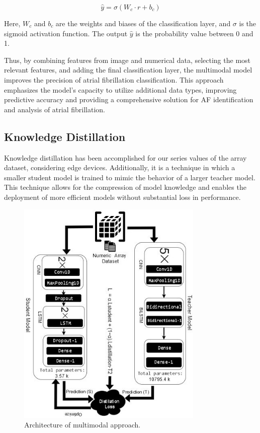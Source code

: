 \documentclass[conference]{IEEEtran}
\begin{document}
\begin{equation}
\hat{y} = \sigma(W_c \cdot r + b_c)
\end{equation}

Here, \( W_c \) and \( b_c \) are the weights and biases of the classification layer, and \( \sigma \) is the sigmoid activation function. The output \( \hat{y} \) is the probability value between 0 and 1.

Thus, by combining features from image and numerical data, selecting the most relevant features, and adding the final classification layer, the multimodal model improves the precision of atrial fibrillation classification. This approach emphasizes the model’s capacity to utilize additional data types, improving predictive accuracy and providing a comprehensive solution for AF identification and analysis of atrial fibrillation.


\subsection{Knowledge Distillation}

Knowledge distillation has been accomplished for our series values of the array dataset, considering edge devices. Additionally, it is a technique in which a smaller student model is trained to mimic the behavior of a larger teacher model. This technique allows for the compression of model knowledge and enables the deployment of more efficient models without substantial loss in performance.

\begin{figure}[htbp]
\centerline{\includegraphics[width=3.5in]{11-KD.jpg}}
\caption{Architecture of multimodal approach.}
\label{fig-11:KD}
\end{figure}
\end{document}
